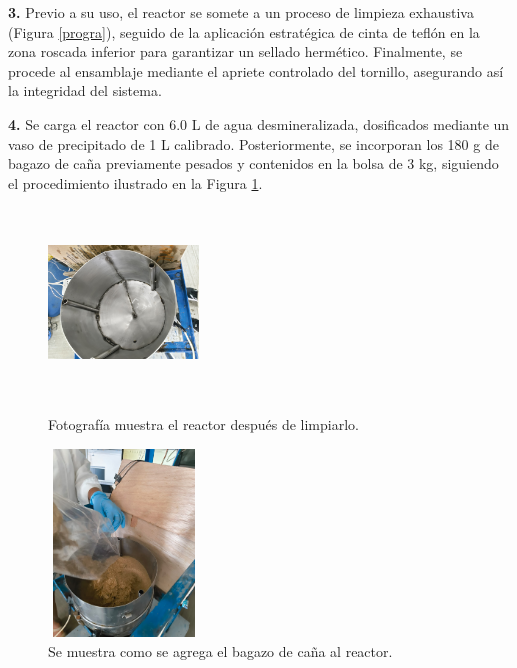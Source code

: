 \documentclass[12pt]{article}
\begin{document}
			\textbf{3.}	Previo a su uso, el reactor se somete a un proceso de limpieza exhaustiva (Figura \ref{progra}), seguido de la aplicación estratégica de cinta de teflón en la zona roscada inferior para garantizar un sellado hermético. Finalmente, se procede al ensamblaje mediante el apriete controlado del tornillo, asegurando así la integridad del sistema.
			
			
			
			\textbf{4.}	Se carga el reactor con 6.0 L de agua desmineralizada, dosificados mediante un vaso de precipitado de 1 L calibrado. Posteriormente, se incorporan los 180 g de bagazo de caña previamente pesados y contenidos en la bolsa de 3 kg, siguiendo el procedimiento ilustrado en la Figura \ref{baciad}.
			

				\begin{figure}[H]
				\centering
				\begin{minipage}{0.46\textwidth}
					\centering
					\includegraphics[width=4cm, height=5cm]{imagenes/reactor limpio} %
					\caption{Fotografía muestra el reactor después de limpiarlo.}
					\label{progra}
				\end{minipage}
				\hfill
				\begin{minipage}{0.48\textwidth}
					\centering
					\includegraphics[width=4cm, height=5cm]{imagenes/biologico5} %
					\caption{Se muestra como se agrega el bagazo de caña al reactor.}
					\label{baciad}
				\end{minipage}
			\end{figure}
			
\end{document}

